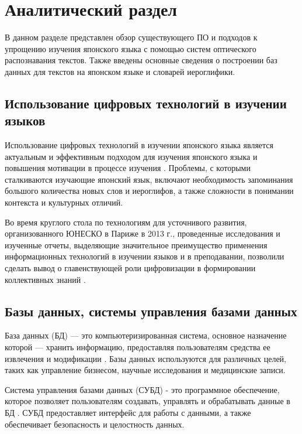 \chapter{Аналитический раздел}

В данном разделе представлен обзор существующего ПО
и подходов к упрощению изучения японского языка с
помощью систем оптического распознавания текстов. Также
введены основные сведения о построении баз данных
для текстов на японском языке и словарей иероглифики.

\section{Использование цифровых технологий в изучении языков}

Использование цифровых технологий в изучении японского языка 
является актуальным и эффективным подходом для изучения
японского языка и повышения мотивации в процессе
изучения \cite{digital-era}. Проблемы, с которыми сталкиваются
изучающие японский язык, включают необходимость запоминания большого количества новых
слов и иероглифов, а также сложности в понимании контекста
и культурных отличий.

Во время круглого стола по технологиям для усточнивого развития, организованного ЮНЕСКО в Париже в 2013 г.,
проведенные исследования и изученные отчеты, выделяющие значительное
преимущество применения информационных технологий в изучении языков
и в преподавании, позволили сделать вывод о главенствующей роли
цифровизации в формировании коллективных знаний \cite{japanese-comp}.

\section{Базы данных, системы управления базами данных}

База данных (БД) --- это компьютеризированная система, основное назначение
которой --- хранить информацию, предоставляя пользователям
средства ее извлечения и модификации \cite[46]{date}. Базы данных
используются для различных целей, таких как управление бизнесом,
научные исследования и медицинские записи.

Система управления базами данных (СУБД) - это программное
обеспечение, которое позволяет пользователям создавать,
управлять и обрабатывать данные в БД \cite[10--12]{pearson-subd}.
СУБД предоставляет интерфейс для работы с данными, а также обеспечивает
безопасность и целостность данных.

